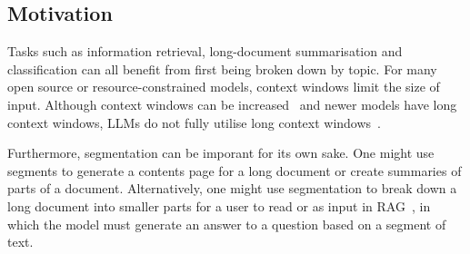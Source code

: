 \subsection{Motivation}


Tasks such as information retrieval, long-document summarisation and classification can all benefit from first being broken down by topic. For many open source or resource-constrained models, context windows limit the size of input. Although context windows can be increased~\cite{ExtendingContextWindows} and newer models have long context windows, LLMs do not fully utilise long context windows~\cite{EffectOfLongContextWindows,ContextAffectsFactual}.

Furthermore, segmentation can be imporant for its own sake. One might use segments to generate a contents page for a long document or create summaries of parts of a document. Alternatively, one might use segmentation to break down a long document into smaller parts for a user to read or as input in RAG~\cite{RAG}, in which the model must generate an answer to a question based on a segment of text.


